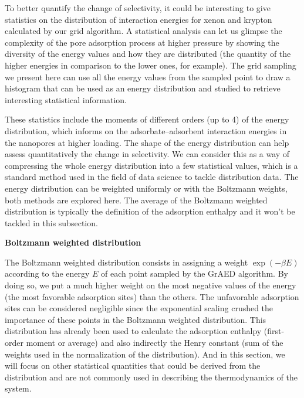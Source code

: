 \documentclass[main]{subfiles}
\begin{document}
To better quantify the change of selectivity, it could be interesting to give statistics on the distribution of interaction energies for xenon and krypton calculated by our grid algorithm. A statistical analysis can let us glimpse the complexity of the pore adsorption process at higher pressure by showing the diversity of the energy values and how they are distributed (the quantity of the higher energies in comparison to the lower ones, for example). The grid sampling we present here can use all the energy values from the sampled point to draw a histogram that can be used as an energy distribution and studied to retrieve interesting statistical information.

These statistics include the moments of different orders (up to 4) of the energy distribution, which informs on the adsorbate--adsorbent interaction energies in the nanopores at higher loading. The shape of the energy distribution can help assess quantitatively the change in selectivity. We can consider this as a way of compressing the whole energy distribution into a few statistical values, which is a standard method used in the field of data science to tackle distribution data. The energy distribution can be weighted uniformly or with the Boltzmann weights, both methods are explored here. The average of the Boltzmann weighted distribution is typically the definition of the adsorption enthalpy and it won't be tackled in this subsection.

\textbf{Boltzmann weighted distribution}

The Boltzmann weighted distribution consists in assigning a weight $\exp(-\beta E)$ according to the energy $E$ of each point sampled by the GrAED algorithm. By doing so, we put a much higher weight on the most negative values of the energy (the most favorable adsorption sites) than the others. The unfavorable adsorption sites can be considered negligible since the exponential scaling crushed the importance of these points in the Boltzmann weighted distribution. This distribution has already been used to calculate the adsorption enthalpy (first-order moment or average) and also indirectly the Henry constant (sum of the weights used in the normalization of the distribution). And in this section, we will focus on other statistical quantities that could be derived from the distribution and are not commonly used in describing the thermodynamics of the system.
\end{document}
